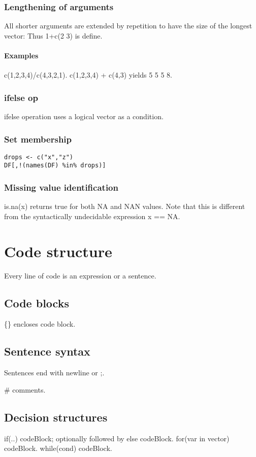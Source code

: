 \documentclass[oneside, article]{memoir}
\begin{document}
\subsubsection{Lengthening of arguments}
All shorter arguments are extended by repetition to have the size of the longest vector: Thus 1+c(2 3) is define.

\paragraph{Examples}
c(1,2,3,4)/c(4,3,2,1). c(1,2,3,4) + c(4,3) yields 5 5 5 8.

\subsubsection{ifelse op}
ifelse operation uses a logical vector as a condition.

\subsubsection{Set membership}
\begin{verbatim}
drops <- c("x","z")
DF[,!(names(DF) %in% drops)]
\end{verbatim}


\subsubsection{Missing value identification}
is.na(x) returns true for both NA and NAN values. Note that this is different from the syntactically undecidable expression x == NA.



\section{Code structure}
Every line of code is an expression or a sentence.

\subsection{Code blocks}
\{\} encloses code block.

\subsection{Sentence syntax}
Sentences end with newline or ;.

\# comments.

\subsection{Decision structures}
if(..) codeBlock; optionally followed by else codeBlock. for(var in vector) codeBlock. while(cond) codeBlock.
\end{document}
